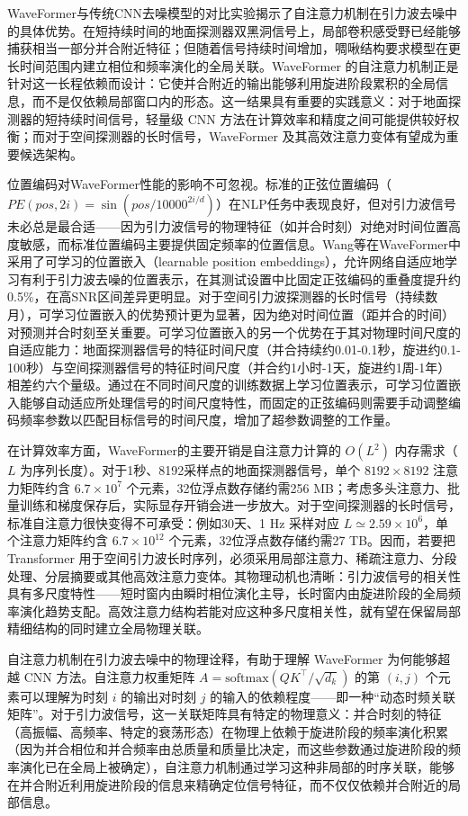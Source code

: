 WaveFormer与传统CNN去噪模型的对比实验揭示了自注意力机制在引力波去噪中的具体优势。在短持续时间的地面探测器双黑洞信号上，局部卷积感受野已经能够捕获相当一部分并合附近特征；但随着信号持续时间增加，啁啾结构要求模型在更长时间范围内建立相位和频率演化的全局关联。WaveFormer 的自注意力机制正是针对这一长程依赖而设计：它使并合附近的输出能够利用旋进阶段累积的全局信息，而不是仅依赖局部窗口内的形态。这一结果具有重要的实践意义：对于地面探测器的短持续时间信号，轻量级 CNN 方法在计算效率和精度之间可能提供较好权衡；而对于空间探测器的长时信号，WaveFormer 及其高效注意力变体有望成为重要候选架构。

位置编码对WaveFormer性能的影响不可忽视。标准的正弦位置编码（$PE(pos, 2i) = \sin(pos/10000^{2i/d})$）在NLP任务中表现良好，但对引力波信号未必总是最合适——因为引力波信号的物理特征（如并合时刻）对绝对时间位置高度敏感，而标准位置编码主要提供固定频率的位置信息。Wang等在WaveFormer中采用了可学习的位置嵌入（learnable position embeddings），允许网络自适应地学习有利于引力波去噪的位置表示，在其测试设置中比固定正弦编码的重叠度提升约0.5\%，在高SNR区间差异更明显。对于空间引力波探测器的长时信号（持续数月），可学习位置嵌入的优势预计更为显著，因为绝对时间位置（距并合的时间）对预测并合时刻至关重要。可学习位置嵌入的另一个优势在于其对物理时间尺度的自适应能力：地面探测器信号的特征时间尺度（并合持续约0.01-0.1秒，旋进约0.1-100秒）与空间探测器信号的特征时间尺度（并合约1小时-1天，旋进约1周-1年）相差约六个量级。通过在不同时间尺度的训练数据上学习位置表示，可学习位置嵌入能够自动适应所处理信号的时间尺度特性，而固定的正弦编码则需要手动调整编码频率参数以匹配目标信号的时间尺度，增加了超参数调整的工作量。

在计算效率方面，WaveFormer的主要开销是自注意力计算的 $O(L^2)$ 内存需求（$L$ 为序列长度）。对于1秒、8192采样点的地面探测器信号，单个 $8192\times8192$ 注意力矩阵约含 $6.7\times10^7$ 个元素，32位浮点数存储约需256 MB；考虑多头注意力、批量训练和梯度保存后，实际显存开销会进一步放大。对于空间探测器的长时信号，标准自注意力很快变得不可承受：例如30天、1 Hz 采样对应 $L\simeq2.59\times10^6$，单个注意力矩阵约含 $6.7\times10^{12}$ 个元素，32位浮点数存储约需27 TB。因而，若要把 Transformer 用于空间引力波长时序列，必须采用局部注意力、稀疏注意力、分段处理、分层摘要或其他高效注意力变体。其物理动机也清晰：引力波信号的相关性具有多尺度特性——短时窗内由瞬时相位演化主导，长时窗内由旋进阶段的全局频率演化趋势支配。高效注意力结构若能对应这种多尺度相关性，就有望在保留局部精细结构的同时建立全局物理关联。

自注意力机制在引力波去噪中的物理诠释，有助于理解 WaveFormer 为何能够超越 CNN 方法。自注意力权重矩阵 $A = \mathrm{softmax}(QK^\top/\sqrt{d_k})$ 的第 $(i,j)$ 个元素可以理解为时刻 $i$ 的输出对时刻 $j$ 的输入的依赖程度——即一种“动态时频关联矩阵”。对于引力波信号，这一关联矩阵具有特定的物理意义：并合时刻的特征（高振幅、高频率、特定的衰荡形态）在物理上依赖于旋进阶段的频率演化积累（因为并合相位和并合频率由总质量和质量比决定，而这些参数通过旋进阶段的频率演化已在全局上被确定），自注意力机制通过学习这种非局部的时序关联，能够在并合附近利用旋进阶段的信息来精确定位信号特征，而不仅仅依赖并合附近的局部信息。

